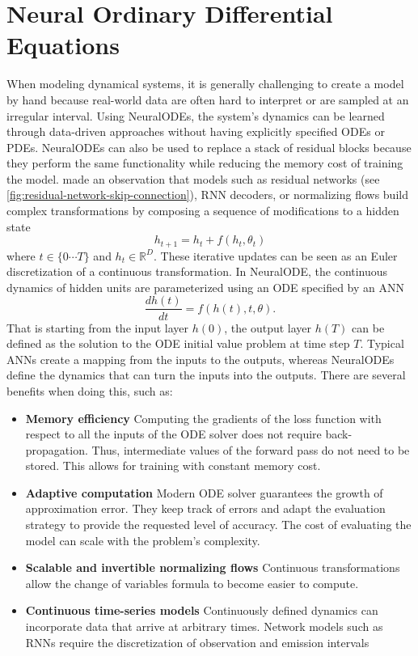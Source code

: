 \section{Neural Ordinary Differential Equations}

When modeling dynamical systems, it is generally challenging to create a model by hand because real-world data are often hard to interpret or are sampled at an irregular interval.
Using \glspl{NeuralODE}, the system's dynamics can be learned through data-driven approaches without having explicitly specified \glspl{ODE} or \glspl{PDE}.
\glspl{NeuralODE} can also be used to replace a stack of residual blocks because they perform the same functionality while reducing the memory cost of training the model.
\citeauthor{chenNeuralOrdinaryDifferential2019} made an observation that models such as residual networks (see \autoref{fig:residual-network-skip-connection}), \gls{RNN} decoders, or normalizing flows build complex transformations by composing a sequence of modifications to a hidden state \cite{chenNeuralOrdinaryDifferential2019}
\begin{equation*}
    h_{t+1} = h_t + f(h_t, \theta_t)
\end{equation*}
where $t \in \{0 \cdots T\}$ and $h_t \in \mathbb{R}^D$.
These iterative updates can be seen as an Euler discretization of a continuous transformation.
In \gls{NeuralODE}, the continuous dynamics of hidden units are parameterized using an \gls{ODE} specified by an \gls{ANN}
\begin{equation*}
    \frac{dh(t)}{dt} = f(h(t), t, \theta).
\end{equation*}
That is starting from the input layer $h(0)$, the output layer $h(T)$ can be defined as the solution to the \gls{ODE} initial value problem at time step $T$.
Typical \glspl{ANN} create a mapping from the inputs to the outputs, whereas \glspl{NeuralODE} define the dynamics that can turn the inputs into the outputs.
There are several benefits when doing this, such as:
\begin{itemize}
    \item \textbf{Memory efficiency}
    Computing the gradients of the loss function with respect to all the inputs of the \gls{ODE} solver does not require back-propagation.
    Thus, intermediate values of the forward pass do not need to be stored.
    This allows for training with constant memory cost.
    \item \textbf{Adaptive computation}
    Modern \gls{ODE} solver guarantees the growth of approximation error.
    They keep track of errors and adapt the evaluation strategy to provide the requested level of accuracy.
    The cost of evaluating the model can scale with the problem's complexity.
    \item \textbf{Scalable and invertible normalizing flows}
    Continuous transformations allow the change of variables formula to become easier to compute.
    \item \textbf{Continuous time-series models}
    Continuously defined dynamics can incorporate data that arrive at arbitrary times.
    Network models such as \glspl{RNN} require the discretization of observation and emission intervals
\end{itemize}

